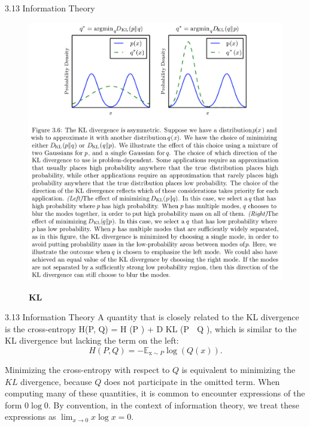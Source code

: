 \begin{frame}{3.13 Information Theory}
    \begin{figure}
        \centering
        \includegraphics[scale=0.20]{images/3-6-prob_KL.png}
        \label{fig:3_6prob_KL}
        \caption{\textbf{KL}}
    \end{figure}
\end{frame}

\begin{frame}{3.13 Information Theory}
    \justifying
    A quantity that is closely related to the KL divergence is the cross-entropy H(P, Q) = H (P ) + D KL (P  Q ), which is similar to the KL divergence but lacking the term on the left:
    \begin{equation}
        H(P, Q) = -\mathbb{E}_{\mathrm{x} \sim P} \log(Q(x)).
        \label{eq:3_51}
    \end{equation}
    
    Minimizing the cross-entropy with respect to $Q$ is equivalent to minimizing the $KL$ divergence, because $Q$ does not participate in the omitted term. When computing many of these quantities, it is common to encounter expressions of the form $0 \log 0$. By convention, in the context of information theory, we treat these expressions as $\lim_{x \rightarrow 0} x \log x = 0$.
\end{frame}

